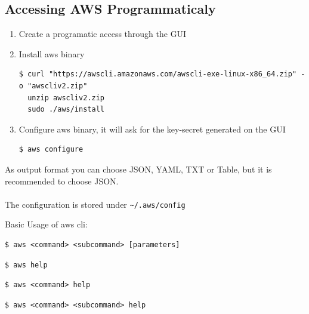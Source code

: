\documentclass{article}
\newenvironment{blocktemplateI}[1]{%
    \tcolorbox[beamer,%
    noparskip,breakable,
    colframe=Violet,%
    colbacklower=Black,%
    title=#1]}%
    {\endtcolorbox}
\newenvironment{codetemplate}[1][]{%
  \mybasecolorbox[#1]
  \itshape
}{%
  \endmybasecolorbox
}
\begin{document}
\subsection{Accessing AWS Programmaticaly}
\begin{enumerate}
    \item Create a programatic access through the GUI
    \item Install aws binary
\begin{codetemplate}{}
\begin{verbatim}
$ curl "https://awscli.amazonaws.com/awscli-exe-linux-x86_64.zip" -o "awscliv2.zip"
  unzip awscliv2.zip
  sudo ./aws/install
\end{verbatim}
\end{codetemplate}

    \item Configure aws binary, it will ask for the key-secret generated on the GUI
\begin{codetemplate}{}
\begin{verbatim}
$ aws configure
\end{verbatim}
\end{codetemplate}
\end{enumerate}
\begin{blocktemplateI}{Note}
As output format you can choose JSON, YAML, TXT or Table, but it is recommended to choose JSON.
\\\\
The configuration is stored under \verb+~/.aws/config+
\end{blocktemplateI}

Basic Usage of aws cli:
\begin{codetemplate}{}
\begin{verbatim}
$ aws <command> <subcommand> [parameters]
\end{verbatim}
\end{codetemplate}

\begin{codetemplate}{}
\begin{verbatim}
$ aws help
\end{verbatim}
\end{codetemplate}

\begin{codetemplate}{}
\begin{verbatim}
$ aws <command> help
\end{verbatim}
\end{codetemplate}

\begin{codetemplate}{}
\begin{verbatim}
$ aws <command> <subcommand> help
\end{verbatim}
\end{codetemplate}
\end{document}
